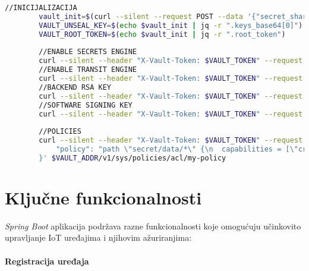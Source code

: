 \documentclass[zavrsnirad]{fer}
\begin{document}
	\begin{lstlisting}[language=bash, caption=Vault Setup]
		//INICIJALIZACIJA
		vault_init=$(curl --silent --request POST --data '{"secret_shares":1, "secret_threshold":1}' $VAULT_ADDR/v1/sys/init)
		VAULT_UNSEAL_KEY=$(echo $vault_init | jq -r ".keys_base64[0]")
		VAULT_ROOT_TOKEN=$(echo $vault_init | jq -r ".root_token")
		
		//ENABLE SECRETS ENGINE
		curl --silent --header "X-Vault-Token: $VAULT_TOKEN" --request POST --data '{"type":"kv-v2"}' $VAULT_ADDR/v1/sys/mounts/secret
		//ENABLE TRANSIT ENGINE
		curl --silent --header "X-Vault-Token: $VAULT_TOKEN" --request POST --data '{"type":"transit"}' $VAULT_ADDR/v1/sys/mounts/transit
		//BACKEND RSA KEY
		curl --silent --header "X-Vault-Token: $VAULT_TOKEN" --request POST --data '{"type": "rsa-2048"}' $VAULT_ADDR/v1/transit/keys/backend
		//SOFTWARE SIGNING KEY
		curl --silent --header "X-Vault-Token: $VAULT_TOKEN" --request POST --data '{"type": "rsa-2048"}' $VAULT_ADDR/v1/transit/keys/software-signing-key
		
		//POLICIES
		curl --silent --header "X-Vault-Token: $VAULT_TOKEN" --request PUT --data '{
			"policy": "path \"secret/data/*\" {\n  capabilities = [\"create\", \"read\", \"update\", \"delete\", \"list\"]\n}\npath \"transit/keys/*\" {\n  capabilities = [\"create\", \"read\", \"update\"]\n}\npath \"transit/encrypt/*\" {\n  capabilities = [\"create\", \"read\", \"update\"]\n}\npath \"transit/decrypt/*\" {\n  capabilities = [\"create\", \"read\", \"update\"]\n}\npath \"transit/sign/*\" {\n  capabilities = [\"create\", \"read\", \"update\"]\n}\npath \"transit/verify/*\" {\n  capabilities = [\"create\", \"read\", \"update\"]\n}\npath \"transit/export/encryption-key/*\" {\n  capabilities = [\"read\", \"update\"]\n}\n"
		}' $VAULT_ADDR/v1/sys/policies/acl/my-policy
	\end{lstlisting}
	
	
	
	
	\section{Ključne funkcionalnosti}
	\label{backend:vault}
	
	\textit{Spring Boot} aplikacija podržava razne funkcionalnosti koje omogućuju učinkovito upravljanje IoT uređajima i njihovim ažuriranjima:
	
	\paragraph{Registracija uređaja}
	
\end{document}

